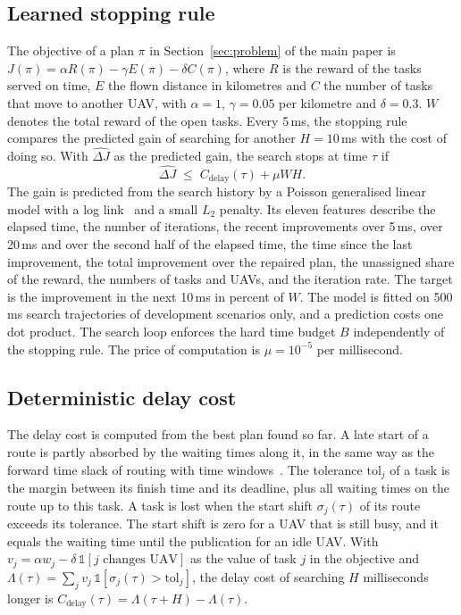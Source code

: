 \subsection{Learned stopping rule}
The objective of a plan $\pi$ in Section~\ref{sec:problem} of the main paper is $J(\pi)=\alpha R(\pi)-\gamma
E(\pi)-\delta C(\pi)$, where $R$ is the reward of the tasks served on time, $E$ the flown distance in kilometres and $C$
the number of tasks that move to another UAV, with $\alpha=1$, $\gamma=0.05$ per kilometre and $\delta=0.3$. $W$ denotes
the total reward of the open tasks. Every 5\,ms, the stopping rule compares the predicted gain of searching for another $H=10$\,ms with the cost of doing so.
With $\widehat{\Delta J}$ as the predicted gain, the search stops at time $\tau$ if
\begin{equation}\label{eq:Sstop}
\widehat{\Delta J}\;\le\;C_{\mathrm{delay}}(\tau)+\mu W H .
\end{equation}
The gain is predicted from the search history by a Poisson generalised linear model with a log
link~\cite{mccullagh1989glm} and a small $L_2$ penalty. Its eleven features describe the elapsed time, the number of
iterations, the recent improvements over 5\,ms, over 20\,ms and over the second half of the elapsed time, the time since
the last improvement, the total improvement over the repaired plan, the unassigned share of the reward, the numbers of
tasks and UAVs, and the iteration rate. The target is the improvement in the next 10\,ms in percent of $W$. The model is
fitted on 500\,ms search trajectories of development scenarios only, and a prediction costs one dot product. The search
loop enforces the hard time budget $B$ independently of the stopping rule. The price of computation is
$\mu=10^{-5}$ per millisecond.

\subsection{Deterministic delay cost}
The delay cost is computed from the best plan found so far. A late start of a route is partly absorbed by the waiting
times along it, in the same way as the forward time slack of routing with time windows~\cite{savelsbergh1992vrptw}. The
tolerance $\mathrm{tol}_j$ of a task is the margin between its finish time and its deadline, plus all waiting times on
the route up to this task. A task is lost when the start shift $\sigma_j(\tau)$ of its route exceeds its tolerance. The
start shift is zero for a UAV that is still busy, and it equals the waiting time until the publication for an idle UAV.
With $v_j=\alpha w_j-\delta\,\mathbb{1}[\text{$j$ changes UAV}]$ as the value of task $j$ in the objective and
$\Lambda(\tau)=\sum_j v_j\,\mathbb{1}[\sigma_j(\tau)>\mathrm{tol}_j]$, the delay cost of searching $H$ milliseconds longer
is $C_{\mathrm{delay}}(\tau)=\Lambda(\tau+H)-\Lambda(\tau)$.

